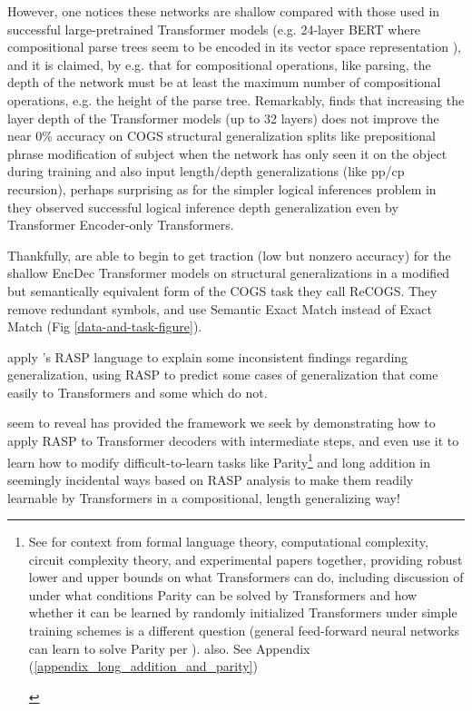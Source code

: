 \documentclass[11pt]{article}
\begin{document}
However, one notices these networks are shallow compared with those used in successful large-pretrained Transformer models (e.g. 24-layer BERT where compositional parse trees seem to be encoded in its vector space representation \citep{hewitt-manning-2019-structural}), and it is claimed, by e.g. \citep{Csordas2022} that for compositional operations, like parsing, the depth of the network must be at least the maximum number of compositional operations, e.g. the height of the parse tree. Remarkably, \citep{petty2024impactdepthcompositionalgeneralization} finds that increasing the layer depth of the Transformer models (up to 32 layers) does not improve the near 0\% accuracy on COGS structural generalization splits like prepositional phrase modification of subject when the network has only seen it on the object during training and also input length/depth generalizations (like pp/cp recursion), perhaps surprising as for the simpler logical inferences problem in \citep{Clark2020} they observed successful logical inference depth generalization even by Transformer Encoder-only Transformers.

Thankfully, \citep{Wu2023} are able to begin to get traction (low but nonzero accuracy) for the shallow EncDec Transformer models on structural generalizations in a modified but semantically equivalent form of the COGS task they call ReCOGS. They remove redundant symbols, and use Semantic Exact Match instead of Exact Match (Fig \ref{data-and-task-figure}).

\citep{Zhou2024} apply \citep{Weiss2021}'s RASP language to explain some inconsistent findings regarding generalization, using RASP to predict some cases of generalization that come easily to Transformers and some which do not.

\citep{Zhou2024} seem to reveal \citep{Weiss2021} has provided the framework we seek by demonstrating how to apply RASP to Transformer decoders with intermediate steps, and even use it to learn how to modify difficult-to-learn tasks like Parity\footnote{\begin{footnotesize}See \citep{Strobl2024} for context from formal language theory, computational complexity, circuit complexity theory, and experimental papers together, providing robust lower and upper bounds on what Transformers can do, including discussion of under what conditions Parity can be solved by Transformers and how whether it can be learned by randomly initialized Transformers under simple training schemes is a different question (general feed-forward neural networks can learn to solve Parity per \citep{10.7551/mitpress/4943.003.0128}). \citep{delétang2023neuralnetworkschomskyhierarchy} also. See Appendix (\ref{appendix_long_addition_and_parity})\end{footnotesize}} and long addition in seemingly incidental ways based on RASP analysis to make them readily learnable by Transformers in a compositional, length generalizing way!
\end{document}
